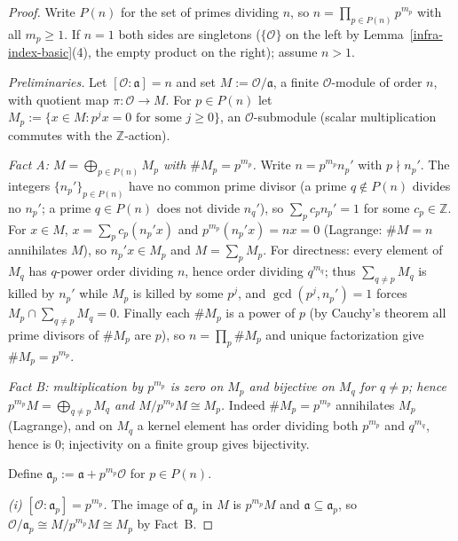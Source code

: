 \begin{proof}
  Write $P(n)$ for the set of primes dividing $n$, so
  $n = \prod_{p \in P(n)} p^{m_p}$ with all $m_p \ge 1$. If $n = 1$ both sides are
  singletons ($\{\mathcal{O}\}$ on the left by Lemma~\ref{infra-index-basic}(4), the empty
  product on the right); assume $n > 1$.

  \emph{Preliminaries.} Let $[\mathcal{O} : \mathfrak{a}] = n$ and set
  $M := \mathcal{O}/\mathfrak{a}$, a finite $\mathcal{O}$-module of order $n$, with quotient
  map $\pi : \mathcal{O} \to M$. For $p \in P(n)$ let
  $M_p := \{x \in M : p^j x = 0 \text{ for some } j \ge 0\}$, an $\mathcal{O}$-submodule
  (scalar multiplication commutes with the $\mathbb{Z}$-action).

  \emph{Fact A: $M = \bigoplus_{p \in P(n)} M_p$ with $\#M_p = p^{m_p}$.}
  Write $n = p^{m_p} n_p'$ with $p \nmid n_p'$. The integers $\{n_p'\}_{p \in P(n)}$ have no
  common prime divisor (a prime $q \notin P(n)$ divides no $n_p'$; a prime $q \in P(n)$ does
  not divide $n_q'$), so $\sum_p c_p n_p' = 1$ for some $c_p \in \mathbb{Z}$. For $x \in M$,
  $x = \sum_p c_p (n_p' x)$ and $p^{m_p}(n_p' x) = nx = 0$ (Lagrange: $\#M = n$ annihilates
  $M$), so $n_p' x \in M_p$ and $M = \sum_p M_p$. For directness: every element of $M_q$ has
  $q$-power order dividing $n$, hence order dividing $q^{m_q}$; thus
  $\sum_{q \ne p} M_q$ is killed by $n_p'$ while $M_p$ is killed by some $p^j$, and
  $\gcd(p^j, n_p') = 1$ forces $M_p \cap \sum_{q \ne p} M_q = 0$. Finally each $\#M_p$ is a
  power of $p$ (by Cauchy's theorem all prime divisors of $\#M_p$ are $p$), so
  $n = \prod_p \#M_p$ and unique factorization give $\#M_p = p^{m_p}$.

  \emph{Fact B: multiplication by $p^{m_p}$ is zero on $M_p$ and bijective on $M_q$ for
  $q \ne p$; hence $p^{m_p} M = \bigoplus_{q \ne p} M_q$ and $M/p^{m_p}M \cong M_p$.}
  Indeed $\#M_p = p^{m_p}$ annihilates $M_p$ (Lagrange), and on $M_q$ a kernel element has
  order dividing both $p^{m_p}$ and $q^{m_q}$, hence is $0$; injectivity on a finite group
  gives bijectivity.

  Define $\mathfrak{a}_p := \mathfrak{a} + p^{m_p}\mathcal{O}$ for $p \in P(n)$.

  \emph{(i) $[\mathcal{O} : \mathfrak{a}_p] = p^{m_p}$.} The image of $\mathfrak{a}_p$ in
  $M$ is $p^{m_p}M$ and $\mathfrak{a} \subseteq \mathfrak{a}_p$, so
  $\mathcal{O}/\mathfrak{a}_p \cong M/p^{m_p}M \cong M_p$ by Fact~B.


\end{proof}
